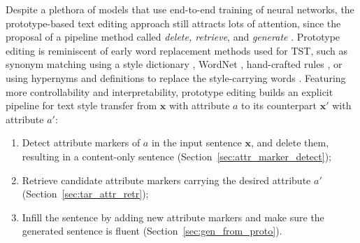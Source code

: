 \label{sec:proto_nlg}
Despite a plethora of models that use end-to-end training of neural networks, the prototype-based text editing approach still attracts lots of attention, since the proposal of a pipeline method called {\it delete, retrieve}, and {\it generate} . 
Prototype editing is reminiscent of early word replacement methods used for TST, such as synonym matching using a style dictionary , WordNet , hand-crafted rules , or using hypernyms and definitions to replace the style-carrying words .
Featuring more controllability and interpretability, prototype editing builds an explicit pipeline for text style transfer from $\bm{x}$ with attribute $a$ to its counterpart $\bm{x}'$ with attribute ${a}'$:
\begin{enumerate}[align=left, 
leftmargin=*,
label=Step \arabic*), ref=\arabic*]
    \item Detect attribute markers of $a$ in the input sentence $\bm{x}$, and delete them, resulting in a content-only sentence (Section~\ref{sec:attr_marker_detect}); \label{item:proto_marker}
    \item Retrieve candidate attribute markers carrying the desired attribute ${a}'$ (Section~\ref{sec:tar_attr_retr}); \label{item:proto_template}
    \item Infill the sentence by adding new attribute markers and make sure the generated sentence is fluent (Section~\ref{sec:gen_from_proto}). \label{item:proto_infill}
\end{enumerate}


